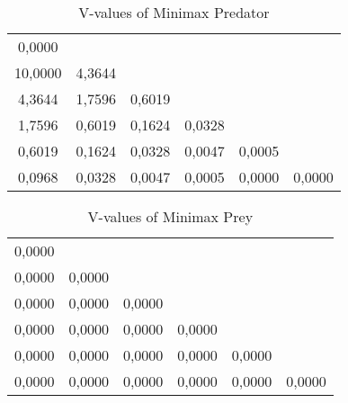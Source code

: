 \begin{table}[htb]
\centering
\begin{tabular}{cccccc}
0,0000 &  &  &  &  & \\
10,0000 & 4,3644 &  &  &  & \\ 
4,3644 & 1,7596 & 0,6019 &  &  & \\
1,7596 & 0,6019 & 0,1624 & 0,0328 &  & \\ 
0,6019 & 0,1624 & 0,0328 & 0,0047 & 0,0005 & \\ 
0,0968 & 0,0328 & 0,0047 & 0,0005 & 0,0000 & 0,0000\\ 
\end{tabular}
\caption{V-values of Minimax Predator}
\label{tab:predM}
\end{table}

\begin{table}[htb]
\centering
\begin{tabular}{cccccc}
0,0000 &  &  &  &  & \\ 
0,0000 & 0,0000 &  &  &  & \\ 
0,0000 & 0,0000 & 0,0000 &  &  & \\ 
0,0000 & 0,0000 & 0,0000 & 0,0000 &  & \\ 
0,0000 & 0,0000 & 0,0000 & 0,0000 & 0,0000 & \\ 
0,0000 & 0,0000 & 0,0000 & 0,0000 & 0,0000 & 0,0000\\ 
\end{tabular}
\caption{V-values of Minimax Prey}
\label{tab:preyM}
\end{table}


\FloatBarrier
\subsection*{}